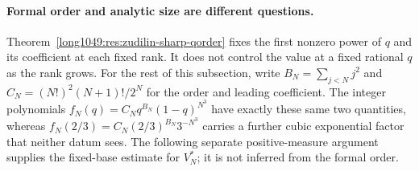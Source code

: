 \paragraph{Formal order and analytic size are different questions.}
Theorem~\ref{long1049:res:zudilin-sharp-qorder} fixes the first nonzero power of $q$ and
its coefficient at each fixed rank.  It does not control the value at a fixed
rational $q$ as the rank grows.  For the rest of this subsection, write $B_N=\sum_{j<N}j^2$ and
$C_N=(N!)^2(N+1)!/2^N$ for the order and leading coefficient.
The integer polynomials $f_N(q)=C_Nq^{B_N}(1-q)^{N^3}$ have exactly
these same two quantities, whereas $f_N(2/3)=C_N(2/3)^{B_N}3^{-N^{3}}$ carries a further
cubic exponential factor that neither datum sees.  The following separate
positive-measure argument supplies the fixed-base estimate for $V_N^*$;
it is not inferred from the formal order.

